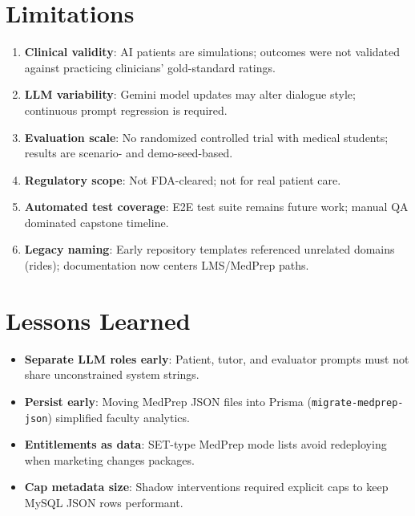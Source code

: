 \section{Limitations}
\begin{enumerate}
  \item \textbf{Clinical validity}: AI patients are simulations; outcomes were not validated against practicing clinicians' gold-standard ratings.
  \item \textbf{LLM variability}: Gemini model updates may alter dialogue style; continuous prompt regression is required.
  \item \textbf{Evaluation scale}: No randomized controlled trial with medical students; results are scenario- and demo-seed-based.
  \item \textbf{Regulatory scope}: Not FDA-cleared; not for real patient care.
  \item \textbf{Automated test coverage}: E2E test suite remains future work; manual QA dominated capstone timeline.
  \item \textbf{Legacy naming}: Early repository templates referenced unrelated domains (rides); documentation now centers LMS/MedPrep paths.
\end{enumerate}

\section{Lessons Learned}
\begin{itemize}
  \item \textbf{Separate LLM roles early}: Patient, tutor, and evaluator prompts must not share unconstrained system strings.
  \item \textbf{Persist early}: Moving MedPrep JSON files into Prisma (\texttt{migrate-medprep-json}) simplified faculty analytics.
  \item \textbf{Entitlements as data}: SET-type MedPrep mode lists avoid redeploying when marketing changes packages.
  \item \textbf{Cap metadata size}: Shadow interventions required explicit caps to keep MySQL JSON rows performant.
\end{itemize}

